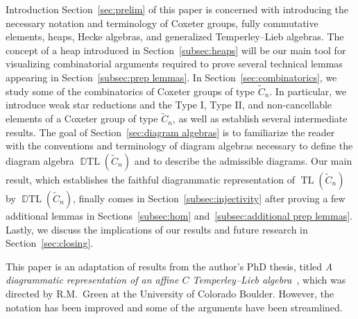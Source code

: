 \documentclass[11pt]{amsart}
\theoremstyle{definition}
\numberwithin{equation}{section}
\newcommand{\C}{\widetilde{C}}
\DeclareMathOperator{\TL}{TL}
\DeclareMathOperator{\DTL}{\mathbb{D}TL}
\renewcommand{\(}{\left(}
\renewcommand{\)}{\right)}
\begin{document}
\begin{section}{Introduction}
Section~\ref{sec:prelim} of this paper is concerned with introducing the necessary notation and terminology of Coxeter groups, fully commutative elements, heaps, Hecke algebras, and generalized Temperley--Lieb algebras.  The concept of a heap introduced in Section~\ref{subsec:heaps} will be our main tool for visualizing combinatorial arguments required to prove several technical lemmas appearing in Section~\ref{subsec:prep lemmas}.  In Section~\ref{sec:combinatorics}, we study some of the combinatorics of Coxeter groups of type $\C_n$.  In particular, we introduce weak star reductions and the Type I, Type II, and non-cancellable elements of a Coxeter group of type $\C_n$, as well as establish several intermediate results.   The goal of Section~\ref{sec:diagram algebras} is to familiarize the reader with the conventions and terminology of diagram algebras necessary to define the diagram algebra $\DTL(\C_n)$ and to describe the admissible diagrams.  Our main result, which establishes the faithful diagrammatic representation of $\TL(\C_n)$ by $\DTL(\C_n)$, finally comes in Section~\ref{subsec:injectivity} after proving a few additional lemmas in Sections~\ref{subsec:hom} and~\ref{subsec:additional prep lemmas}.  Lastly, we discuss the implications of our results and future research in Section~\ref{sec:closing}.

This paper is an adaptation of results from the author's PhD thesis, titled \emph{A diagrammatic representation of an affine $C$ Temperley--Lieb algebra}~\cite{Ernst2008}, which was directed by R.M.~Green at the University of Colorado Boulder.  However, the notation has been improved and some of the arguments have been streamlined.  
\end{section}

\end{document}
